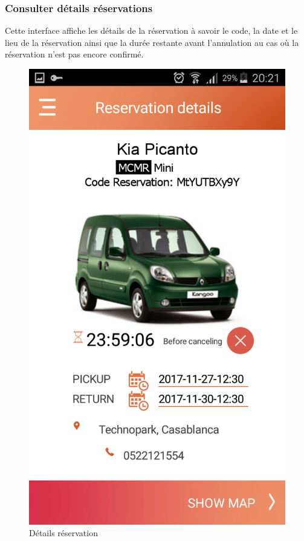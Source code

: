 \documentclass[12pt,a4paper]{report}
\begin{document}
	\subsubsection{Consulter détails réservations}
Cette interface affiche les détails de la réservation à savoir le code, la date et le lieu de la réservation ainsi que la durée restante avant l'annulation au cas où la réservation n'est pas encore confirmé.
	\vspace{2cm}
	\begin{figure}[!hbtp]
		\centering
		\includegraphics[scale=0.2]{./graphics/DetailsReservation.png}
		\caption{Détails réservation}
		\end{figure}
	
\end{document}
